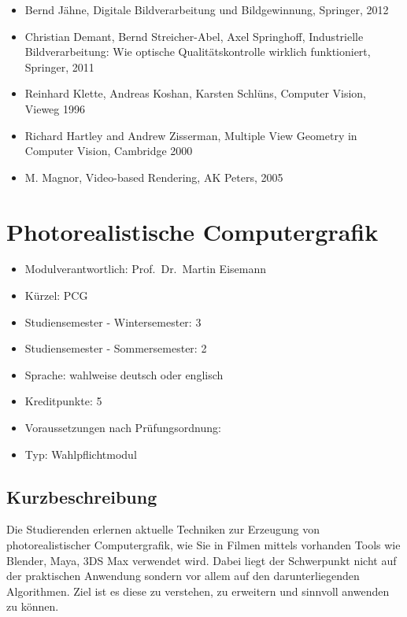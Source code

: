 \begin{itemize}
\tightlist
\item
  Bernd Jähne, Digitale Bildverarbeitung und Bildgewinnung, Springer,
  2012
\item
  Christian Demant, Bernd Streicher-Abel, Axel Springhoff, Industrielle
  Bildverarbeitung: Wie optische Qualitätskontrolle wirklich
  funktioniert, Springer, 2011
\item
  Reinhard Klette, Andreas Koshan, Karsten Schlüns, Computer Vision,
  Vieweg 1996
\item
  Richard Hartley and Andrew Zisserman, Multiple View Geometry in
  Computer Vision, Cambridge 2000
\item
  M. Magnor, Video-based Rendering, AK Peters, 2005
\end{itemize}

\chapter{Photorealistische
Computergrafik}\label{photorealistische-computergrafik}

\begin{itemize}
\tightlist
\item
  Modulverantwortlich: Prof.~Dr.~Martin Eisemann
\item
  Kürzel: PCG
\item
  Studiensemester - Wintersemester: 3
\item
  Studiensemester - Sommersemester: 2
\item
  Sprache: wahlweise deutsch oder englisch
\item
  Kreditpunkte: 5
\item
  Voraussetzungen nach Prüfungsordnung: ~
\item
  Typ: Wahlpflichtmodul
\end{itemize}

\section*{Kurzbeschreibung}\label{kurzbeschreibung-7}

Die Studierenden erlernen aktuelle Techniken zur Erzeugung von
photorealistischer Computergrafik, wie Sie in Filmen mittels vorhanden
Tools wie Blender, Maya, 3DS Max verwendet wird. Dabei liegt der
Schwerpunkt nicht auf der praktischen Anwendung sondern vor allem auf
den darunterliegenden Algorithmen. Ziel ist es diese zu verstehen, zu
erweitern und sinnvoll anwenden zu können.


